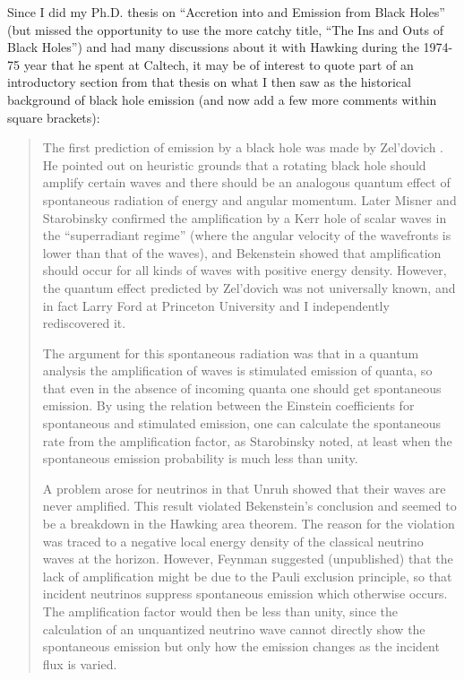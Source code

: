 \documentclass[12pt]{article} \usepackage{latexsym} \textwidth 15cm
\begin{document}
Since I did my Ph.D. thesis \cite{Pagethesis} on ``Accretion into and
Emission from Black Holes'' (but missed the opportunity to use the more
catchy title, ``The Ins and Outs of Black Holes'') and had many
discussions about it with Hawking during the 1974-75 year that he spent
at Caltech, it may be of interest to quote part of an introductory
section from that thesis on what I then saw as the historical background
of black hole emission (and now add a few more comments within square
brackets):

\begin{quotation}
The first prediction of emission by a black hole was made by
Zel'dovich \cite{Zel1,Zel2}.  He pointed out on heuristic grounds that a
rotating black hole should amplify certain waves and there
should be an analogous quantum effect of spontaneous radiation of
energy and angular momentum.  Later Misner \cite{Mis} and Starobinsky
\cite{Star} confirmed the amplification by a Kerr hole of scalar waves
in the ``superradiant regime'' (where the angular velocity of the
wavefronts is lower than that of the waves), and Bekenstein
\cite{Beka} showed that amplification should occur for all kinds of
waves with positive energy density.  However, the quantum effect
predicted by Zel'dovich was not universally known, and in fact Larry
Ford at Princeton University and I independently rediscovered it.

The argument for this spontaneous radiation was that in a quantum
analysis the amplification of waves is stimulated emission of quanta,
so that even in the absence of incoming quanta one should get
spontaneous emission.  By using the relation between the Einstein
coefficients for spontaneous and stimulated emission, one can
calculate the spontaneous rate from the amplification factor, as
Starobinsky \cite{Star} noted, at least when the spontaneous emission
probability is much less than unity.

A problem arose for neutrinos in that Unruh \cite{Unruh73} showed that
their waves are never amplified.  This result violated Bekenstein's
conclusion and seemed to be a breakdown in the Hawking \cite{Hawkingarea}
area theorem.  The reason for the violation was traced to a negative
local energy density of the classical neutrino waves at the horizon.
However, Feynman suggested (unpublished) that the lack of
amplification might be due to the Pauli exclusion principle, so that
incident neutrinos suppress spontaneous emission which otherwise
occurs.  The amplification factor would then be less than unity, since
the calculation of an unquantized neutrino wave cannot directly show
the spontaneous emission but only how the emission changes as the
incident flux is varied.


\end{quotation}
\end{document}
